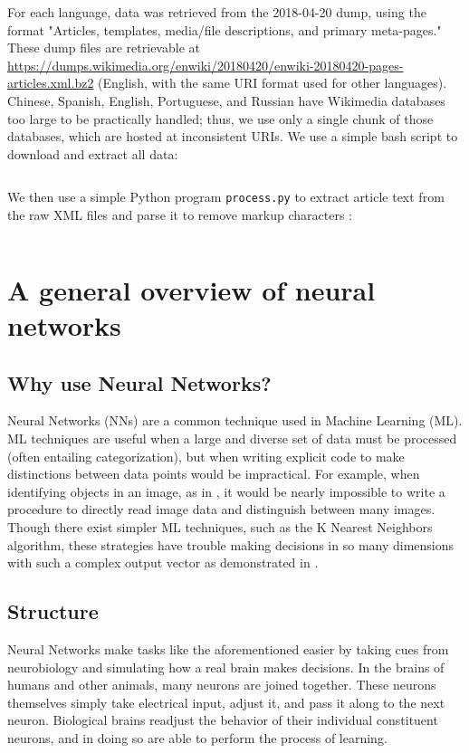 \documentclass{article}
\begin{document}
For each language, data was retrieved from the 2018-04-20 dump, using the format "Articles, templates, media/file descriptions, and primary meta-pages." These dump files are retrievable at \url{https://dumps.wikimedia.org/enwiki/20180420/enwiki-20180420-pages-articles.xml.bz2} (English, with the same URI format used for other languages). Chinese, Spanish, English, Portuguese, and Russian have Wikimedia databases too large to be practically handled; thus, we use only a single chunk of those databases, which are hosted at inconsistent URIs. We use a simple bash script to download and extract all data:
\inputminted{bash}{data/download.sh}

We then use a simple Python program \texttt{process.py} to extract article text from the raw XML files and parse it to remove markup characters \cite{parsewikixml}:
\inputminted{python}{data/process.py}

\section{A general overview of neural networks}
\subsection{Why use Neural Networks?}
Neural Networks (NNs) are a common technique used in Machine Learning (ML). ML techniques are useful when a large and diverse set of data must be processed (often entailing categorization), but when writing explicit code to make distinctions between data points would be impractical. For example, when identifying objects in an image, as in \cite{hinton12}, it would be nearly impossible to write a procedure to directly read image data and distinguish between many images. Though there exist simpler ML techniques, such as the K Nearest Neighbors algorithm, these strategies have trouble making decisions in so many dimensions with such a complex output vector as demonstrated in \cite{knnic}.

\subsection{Structure}
Neural Networks make tasks like the aforementioned easier by taking cues from neurobiology and simulating how a real brain makes decisions. In the brains of humans and other animals, many neurons are joined together. These neurons themselves simply take electrical input, adjust it, and pass it along to the next neuron. Biological brains readjust the behavior of their individual constituent neurons, and in doing so are able to perform the process of learning.
\end{document}
